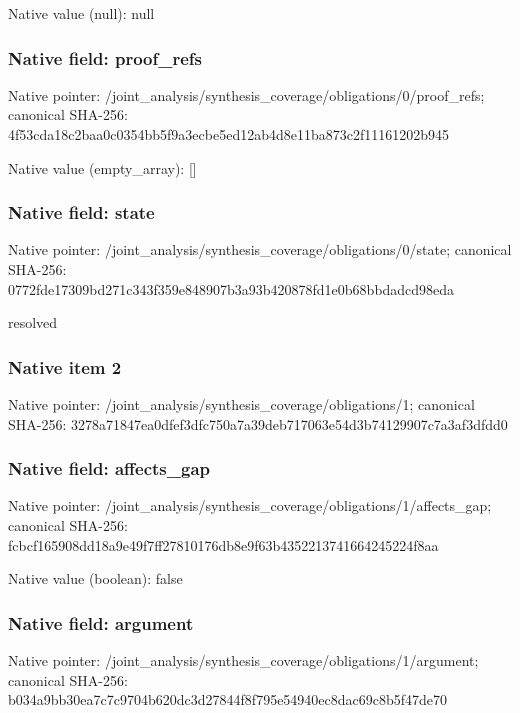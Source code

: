 \documentclass[10pt,a4paper]{article}
\begin{document}
Native value (null): null

\subsubsection{Native field: proof\_\allowbreak{}refs}
Native pointer: /joint\_\allowbreak{}analysis/synthesis\_\allowbreak{}coverage/obligations/0/proof\_\allowbreak{}refs; canonical SHA-256: 4f53cda18c2baa0c0354bb5f9a3ecbe5ed12ab4d8e11ba873c2f11161202b945

Native value (empty\_\allowbreak{}array): []

\subsubsection{Native field: state}
Native pointer: /joint\_\allowbreak{}analysis/synthesis\_\allowbreak{}coverage/obligations/0/state; canonical SHA-256: 0772fde17309bd271c343f359e848907b3a93b420878fd1e0b68bbdadcd98eda

\begingroup\raggedright\sloppy resolved\par\endgroup

\subsubsection{Native item 2}
Native pointer: /joint\_\allowbreak{}analysis/synthesis\_\allowbreak{}coverage/obligations/1; canonical SHA-256: 3278a71847ea0dfef3dfc750a7a39deb717063e54d3b74129907c7a3af3dfdd0

\subsubsection{Native field: affects\_\allowbreak{}gap}
Native pointer: /joint\_\allowbreak{}analysis/synthesis\_\allowbreak{}coverage/obligations/1/affects\_\allowbreak{}gap; canonical SHA-256: fcbcf165908dd18a9e49f7ff27810176db8e9f63b4352213741664245224f8aa

Native value (boolean): false

\subsubsection{Native field: argument}
Native pointer: /joint\_\allowbreak{}analysis/synthesis\_\allowbreak{}coverage/obligations/1/argument; canonical SHA-256: b034a9bb30ea7c7c9704b620dc3d27844f8f795e54940ec8dac69c8b5f47de70
\end{document}
